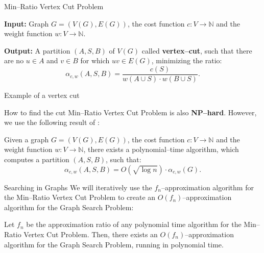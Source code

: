 \documentclass{beamer}
\newcommand{\br}[1]{\mathopen{}\left( #1 \right)}
\begin{document}
\begin{frame}{Min–Ratio Vertex Cut Problem}

\begin{tcolorbox}[colback=white, title= Min–Ratio Vertex Cut Problem, fonttitle=\bfseries, breakable]
\textbf{Input:} Graph $G=\br{V\br{G}, E\br{G}}$, the cost function $c\colon V\to \mathbb{N}$ and the weight function $w\colon V\to \mathbb{N}$.

\pause
\textbf{Output:} A partition $\br{A,S,B}$ of $V\br{G}$ called \textbf{vertex–cut}, such that there are no $u\in A$ and $v\in B$ for which $uv\in E\br{G}$, minimizing the ratio:
$$
\alpha_{c,w}\br{A,S,B}=\frac{c\br{S}}{w\br{A\cup S}\cdot w\br{B\cup S}}.
$$
\end{tcolorbox}
\end{frame}


\begin{frame}{Example of a vertex cut}
    
\end{frame}

\begin{frame}{How to find the cut}
Min–Ratio Vertex Cut Problem is also \textbf{NP–hard}. However, we use the following result of \cite{Improvedapproximationalgorithmsvertexseparators}:
\begin{theorem}\label{approxmrvc}
    Given a graph $G=\br{V\br{G}, E\br{G}}$, the cost function $c:V\to\mathbb{N}$ and the weight function $w:V\to \mathbb{N}$, there exists a
polynomial–time algorithm, which computes a partition $(A, S, B)$, such that:
$$
\alpha_{c,w}\br{A,S,B}=O\br{\sqrt{\log n
}}\cdot\alpha_{c,w}\br{G}.
$$
\end{theorem}
\end{frame}


\begin{frame}{Searching in Graphs}
We will iteratively use the $f_n$–approximation algorithm for the Min–Ratio Vertex Cut Problem to create an $O\br{f_n}$–approximation algorithm for the Graph Search Problem:
\pause
\begin{theorem}
    Let $f_n$ be the approximation ratio of any polynomial time algorithm for the Min–Ratio Vertex Cut Problem. Then, there exists an $O\br{f_n}$–approximation algorithm for the Graph Search Problem, running in polynomial time.
\end{theorem}
    
\end{frame}
\end{document}
